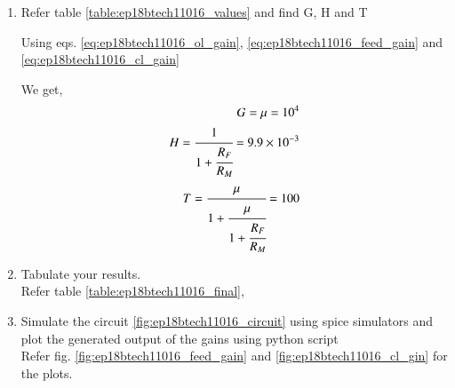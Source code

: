 \begin{enumerate}[label=\arabic*.,ref=\theenumi]
\item Refer table \ref{table:ep18btech11016_values} and find G, H and T

\begin{table}[!ht]
    \centering
    
    \caption{}
    \label{table:ep18btech11016_values}
\end{table}

\solution Using eqs. \ref{eq:ep18btech11016_ol_gain}, \ref{eq:ep18btech11016_feed_gain} and \ref{eq:ep18btech11016_cl_gain}

We get,
\begin{align}
    G = \mu = 10^4\\
    H = \cfrac{ 1 }{1 + \cfrac{R_F}{R_M}} = 9.9 \times 10^{-3}\\
    T = \cfrac{\mu}{1 + \cfrac{\mu}{1 + \cfrac{R_F}{R_M}}} = 100
\end{align}


\item Tabulate your results.
\\
\solution Refer table \ref{table:ep18btech11016_final},

\begin{table}[!ht]
    \centering
    
    \caption{}
    \label{table:ep18btech11016_final}
\end{table}


\item Simulate the circuit \ref{fig:ep18btech11016_circuit} using spice simulators and plot the generated output of the gains using python script
\\
\solution Refer fig. \ref{fig:ep18btech11016_feed_gain} and \ref{fig:ep18btech11016_cl_gin} for the plots.


\end{enumerate}
